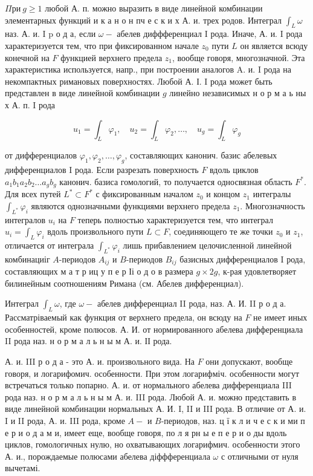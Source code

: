 \documentclass[10pt]{article}
\begin{document}
$\Pi р и ~ g \geqslant 1$ любой А. п. можно выразить в виде линейной комбинации элементарных функций и к а н о н пч е с к и х А. и. трех родов. Интеграл $\int_{L} \omega$ наз. А. и. I p о д а, если $\omega-$ абелев диффференциал I рода. Иначе, А. и. I рода характеризуется тем, что при фиксированном начале $z_{0}$ пути $L$ он является всюду конечной на $F$ функцией верхнего предела $z_{1}$, вообще говоря, многозначной. Эта характеристика используется, напр., при построении аналогов A. и. I рода на некомпактных римановых поверхностях. Любой А. І. I рода может быть представлен в виде линейной комбинации $g$ линейно независимых н о р м а ь ны х А. п. I рода



\[

u_{1}=\int_{L} \varphi_{1}, \quad u_{2}=\int_{L} \varphi_{2}, \ldots, \quad u_{g}=\int_{L} \varphi_{g}

\]



от дифференциалов $\varphi_{1}, \varphi_{2}, \ldots, \varphi_{g}$, составляющих канонич. базис абелевых дифференциалов I рода. Если разрезать поверхность $F$ вдоль циклов $a_{1} b_{1} a_{2} b_{2} \ldots a_{g} b_{g}$ канонич. базиса гомологий, то получается односвязная область $F^{*}$. Для всех путей $L^{*} \subset F^{*}$ с фиксированным началом $z_{0}$ и концом $z_{1}$ интегралы $\int_{L^{*}} \varphi_{i}$ являются однозначными функциями верхнего предела $z_{1}$. Многозначность интегралов $u_{i}$ на $F$ теперь полностью характеризуется тем, что интеграл $u_{i}=\int_{L} \varphi_{i}$ вдоль произвольного пути $L \subset F$, соединяющего те же точки $z_{0}$ и $z_{1}$, отличается от интеграла $\int_{L^{*}} \varphi_{i}$ лишь прибавлением целочисленной линейной комбинациіг $A$-периодов $A_{i j}$ и $B$-периодов $B_{i j}$ базисных дифференциалов I рода, составляющих м а т р иц у п е р Іі о д о в размера $g \times 2 g$, к-рая удовлетворяет билинейным соотношениям Римана (см. Абелев дифференциал).



Интеграл $\int_{L} \omega$, где $\omega-$ абелев дифференциал II рода, наз. А. И. II р о д а. Рассматріваемый как функция от верхнего предела, он всюду на $F$ не имеет иных особенностей, кроме полюсов. А. И. от нормированного абелева дифференциала II рода наз. н о р м а л ь н ы м А. и. ІІ рода.



А. и. III р о д а - это А. и. произвольного вида. На $F$ они допускают, вообще говоря, и логарифомич. особенности. При этом логарифміч. особенности могут встречаться только попарно. А. и. от нормального абелева дифференциала III рода наз. н о р м а л ь н ы м А. и. III рода. Любой А. и. можно представить в виде линейной комбинации нормальных А. И. I, II и III рода. В отличие от А. и. I и II рода, А. и. III рода, кроме $A-$ и $B$-периодов, наз. ц ї $к$ л и ч е с к и ми п е р и о д а м и, имеет еще, вообще говоря, по л я рн ы е п е р и о ды вдоль циклов, гомологичных нулю, но охватывающих логарифмич. особенности этого А. и., порождаемые полюсами абелева діффференциала $\omega$ с отличными от нуля вычетамі.
\end{document}

